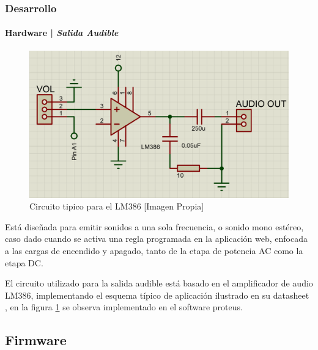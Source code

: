 \begin{frame}
\frametitle{Desarrollo}
\framesubtitle{Hardware | \emph{Salida Audible}}

\begin{figure}
	\centering
	\caption{Circuito tipico para el LM386 [Imagen Propia]}
	\label{fig:AUD}
	\includegraphics[width=0.8\linewidth]{Imagenes/AUD}
\end{figure}
		Está diseñada para emitir sonidos a una sola frecuencia, o sonido mono estéreo, caso dado cuando se activa una regla programada en la aplicación web, enfocada a las cargas de encendido y apagado, tanto de la etapa de potencia AC como la etapa DC.\newline
		
		El circuito utilizado para la salida audible está basado en el amplificador de audio LM386, implementando el esquema típico de aplicación ilustrado en su datasheet \cite{LM386}, en la figura \ref{fig:AUD} se observa implementado en el software proteus.\\
\end{frame}		
				
\subsection{Firmware}

